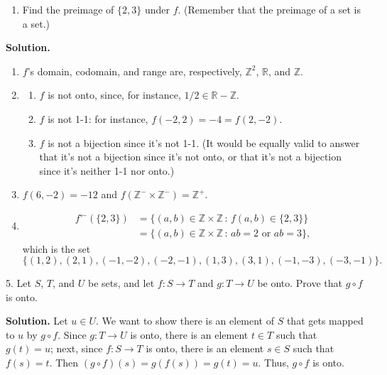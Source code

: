 \documentclass[10pt,]{book}
\theoremstyle{plain}
\theoremstyle{definition}
\theoremstyle{definition}
\theoremstyle{definition}
\theoremstyle{definition}
\numberwithin{equation}{section}
\def\Z{\mathbb{Z}}
\def\R{\mathbb{R}}
\newcommand{\amp}{&}
\begin{document}
\begin{exerciselist}
\begin{enumerate}[label=(\alph*)]
\item\hypertarget{li-45}{}Find the preimage of \(\{2,3\}\) under \(f\). (Remember that the preimage of a set is a set.)%
\end{enumerate}
%
\par\smallskip
\par\smallskip
\noindent\textbf{Solution.}\hypertarget{solution-4}{}\quad
\leavevmode%
\begin{enumerate}[label=(\alph*)]
\item\hypertarget{li-46}{}\(f\)'s domain, codomain, and range are, respectively, \(\Z^2\), \(\R\), and \(\Z\).%
\item\hypertarget{li-47}{}%
\begin{enumerate}[label=\roman*.]
\item\hypertarget{li-48}{}\(f\) is not onto, since, for instance, \(1/2\in \R-\Z\).%
\item\hypertarget{li-49}{}\(f\) is not 1-1: for instance, \(f(-2,2)=-4=f(2,-2)\).%
\item\hypertarget{li-50}{}\(f\) is not a bijection since it's not 1-1. (It would be equally valid to answer that it's not a bijection since it's not onto, or that it's not a bijection since it's neither 1-1 nor onto.)%
\end{enumerate}
%
\item\hypertarget{li-51}{}\(f(6,-2)=-12\) and \(f(\Z^-\times \Z^-)=\Z^+\).%
\item\hypertarget{li-52}{}%
\begin{align*}
f^{\leftarrow}(\{2,3\})\amp =\{(a,b)\in \Z\times \Z\,:\, f(a,b)\in \{2,3\}\}\\
\amp =\{(a,b)\in \Z\times \Z\,:\, ab=2 \mbox{ or }  ab=3\},
\end{align*}
which is the set%
\begin{equation*}
\{(1,2),(2,1),(-1,-2),(-2,-1),(1,3),(3,1),(-1,-3),(-3,-1)\}.
\end{equation*}
%
\end{enumerate}
%
\item[5.]\hypertarget{exercise-5}{}Let \(S\), \(T\), and \(U\) be sets, and let \(f: S\to T\) and \(g: T\to U\) be onto. Prove that \(g \circ f\) is onto.%
\par\smallskip
\par\smallskip
\noindent\textbf{Solution.}\hypertarget{solution-5}{}\quad
Let \(u\in U\). We want to show there is an element of \(S\) that gets mapped to \(u\) by \(g\circ f\). Since \(g:T\to U\) is onto, there is an element \(t\in T\) such that \(g(t)=u\); next, since \(f:S\to T\) is onto, there is an element \(s\in S\) such that \(f(s)=t\). Then \((g\circ f)(s)=g(f(s))=g(t)=u\). Thus, \(g\circ f\) is onto.%

\end{exerciselist}
\end{document}

